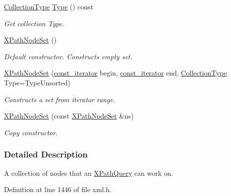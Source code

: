 \begin{DoxyCompactItemize}
\hyperlink{classphys_1_1xml_1_1XPathNodeSet_ab178d39e119369702541033c067a995c}{CollectionType} \hyperlink{classphys_1_1xml_1_1XPathNodeSet_a95c90708290e045ef04425a71b2ddf25}{Type} () const 
\begin{DoxyCompactList}\small\item\em Get collection Type. \item\end{DoxyCompactList}\item 
\hypertarget{classphys_1_1xml_1_1XPathNodeSet_a24b0e325cd45548e3f63bd37557eab93}{
\hyperlink{classphys_1_1xml_1_1XPathNodeSet_a24b0e325cd45548e3f63bd37557eab93}{XPathNodeSet} ()}
\label{classphys_1_1xml_1_1XPathNodeSet_a24b0e325cd45548e3f63bd37557eab93}

\begin{DoxyCompactList}\small\item\em Default constructor. Constructs empty set. \item\end{DoxyCompactList}\item 
\hyperlink{classphys_1_1xml_1_1XPathNodeSet_a4184ec067744749dd044f7740d2dc6e3}{XPathNodeSet} (\hyperlink{classphys_1_1xml_1_1XPathNode}{const\_\-iterator} begin, \hyperlink{classphys_1_1xml_1_1XPathNode}{const\_\-iterator} end, \hyperlink{classphys_1_1xml_1_1XPathNodeSet_ab178d39e119369702541033c067a995c}{CollectionType} Type=TypeUnsorted)
\begin{DoxyCompactList}\small\item\em Constructs a set from iterator range. \item\end{DoxyCompactList}\item 
\hyperlink{classphys_1_1xml_1_1XPathNodeSet_af4ac7af973425828bd66dc278887695c}{XPathNodeSet} (const \hyperlink{classphys_1_1xml_1_1XPathNodeSet}{XPathNodeSet} \&ns)
\begin{DoxyCompactList}\small\item\em Copy constructor. \item\end{DoxyCompactList}\end{DoxyCompactItemize}


\subsubsection{Detailed Description}
A collection of nodes that an \hyperlink{classphys_1_1xml_1_1XPathQuery}{XPathQuery} can work on. 

Definition at line 1446 of file xml.h.



